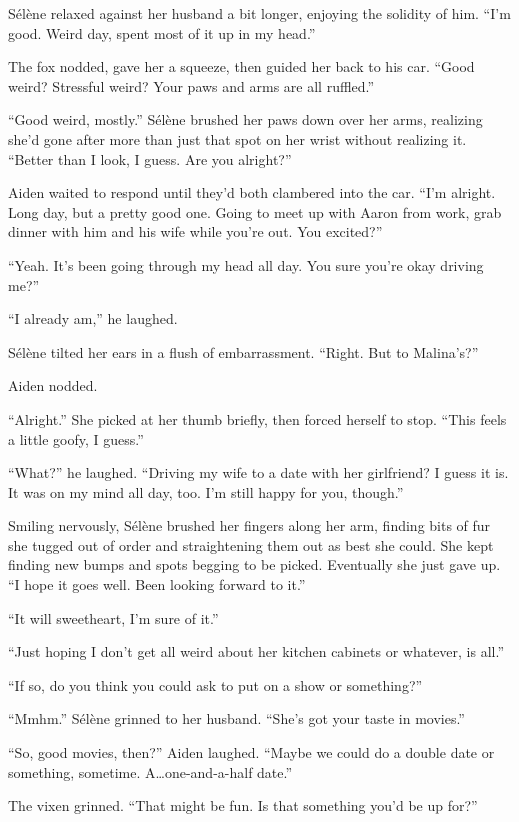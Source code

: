 Sélène relaxed against her husband a bit longer, enjoying the solidity of him. ``I'm good. Weird day, spent most of it up in my head.''

The fox nodded, gave her a squeeze, then guided her back to his car. ``Good weird? Stressful weird? Your paws and arms are all ruffled.''

``Good weird, mostly.'' Sélène brushed her paws down over her arms, realizing she'd gone after more than just that spot on her wrist without realizing it. ``Better than I look, I guess. Are you alright?''

Aiden waited to respond until they'd both clambered into the car. ``I'm alright. Long day, but a pretty good one. Going to meet up with Aaron from work, grab dinner with him and his wife while you're out. You excited?''

``Yeah. It's been going through my head all day. You sure you're okay driving me?''

``I already am,'' he laughed.

Sélène tilted her ears in a flush of embarrassment. ``Right. But to Malina's?''

Aiden nodded.

``Alright.'' She picked at her thumb briefly, then forced herself to stop. ``This feels a little goofy, I guess.''

``What?'' he laughed. ``Driving my wife to a date with her girlfriend? I guess it is. It was on my mind all day, too. I'm still happy for you, though.''

Smiling nervously, Sélène brushed her fingers along her arm, finding bits of fur she tugged out of order and straightening them out as best she could. She kept finding new bumps and spots begging to be picked. Eventually she just gave up. ``I hope it goes well. Been looking forward to it.''

``It will sweetheart, I'm sure of it.''

``Just hoping I don't get all weird about her kitchen cabinets or whatever, is all.''

``If so, do you think you could ask to put on a show or something?''

``Mmhm.'' Sélène grinned to her husband. ``She's got your taste in movies.''

``So, good movies, then?'' Aiden laughed. ``Maybe we could do a double date or something, sometime. A\ldots{}one-and-a-half date.''

The vixen grinned. ``That might be fun. Is that something you'd be up for?''


